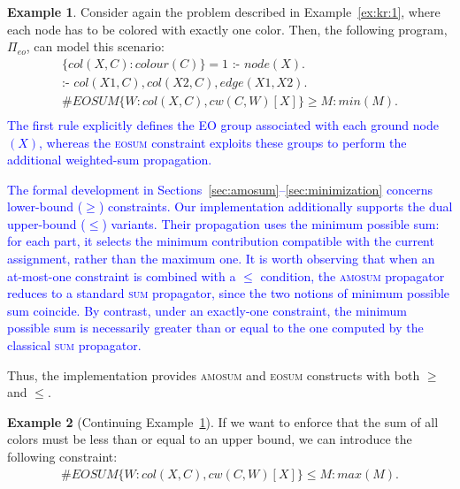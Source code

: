 \documentclass[preprint,authoryear]{elsarticle}
\theoremstyle{definition}
\newtheorem{example}{Example}[section]
\begin{document}
\begin{example}
\label{ex:kr:2}
Consider again the problem described in Example~\ref{ex:kr:1}, where each node has to be colored with exactly one color.
Then, the following program, $\Pi_\mathit{eo}$, can model this scenario:
$$\begin{array}{l}
        \{\mathit{col}(X,C) : \mathit{colour}(C)\} = 1 \text{ :- } \mathit{node}(X). \\ 
        \text{:- }\mathit{col}(X1,C), \mathit{col}(X2,C), \mathit{edge}(X1,X2). \\
        \#\mathit{EOSUM}\{ W: \mathit{col}(X,C), \mathit{cw}(C,W) [X]\} \ge \mathit{M} : \mathit{min}(M). \\
    \end{array}$$
\textcolor{blue}{The first rule explicitly defines the EO group associated with each ground node $(X)$, whereas the \textsc{eosum} constraint exploits these groups to perform the additional weighted-sum propagation.}
\end{example}

\textcolor{blue}{The formal development in Sections~\ref{sec:amosum}--\ref{sec:minimization} concerns lower-bound ($\ge$) constraints. Our implementation additionally supports the dual upper-bound ($\le$) variants. Their propagation uses the minimum possible sum: for each part, it selects the minimum contribution compatible with the current assignment, rather than the maximum one.
It is worth observing that when an at-most-one constraint is combined with a $\le$ condition, the \textsc{amosum} propagator reduces to a standard \textsc{sum} propagator, since the two notions of minimum possible sum coincide.
By contrast, under an exactly-one constraint, the minimum possible sum is necessarily greater than or equal to the one computed by the classical \textsc{sum} propagator.}

Thus, the implementation provides \textsc{amosum} and \textsc{eosum} constructs with both $\ge$ and $\le$. 
\begin{example}[Continuing Example~\ref{ex:kr:2}]
    If we want to enforce that the sum of all colors must be less than or equal to an upper bound, we can introduce the following constraint:
$$\begin{array}{l}
        \#\mathit{EOSUM}\{ W: \mathit{col}(X,C), \mathit{cw}(C,W) [X]\} \le \mathit{M} : \mathit{max}(M). \\
    \end{array}$$
\end{example}
\end{document}
